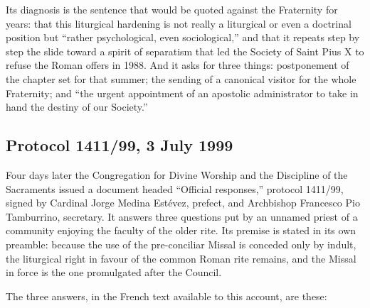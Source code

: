 Its diagnosis is the sentence that would be quoted against the Fraternity
for years: that this liturgical hardening is not really a liturgical or
even a doctrinal position but ``rather psychological, even sociological,''
and that it repeats step by step the slide toward a spirit of separatism
that led the Society of Saint Pius X to refuse the Roman offers in 1988.
And it asks for three things: postponement of the chapter set for that
summer; the sending of a canonical visitor for the whole Fraternity; and
``the urgent appointment of an apostolic administrator to take in hand the
destiny of our Society.''

\subsection{Protocol 1411/99, 3 July 1999}

Four days later the Congregation for Divine Worship and the Discipline of
the Sacraments issued a document headed ``Official responses,'' protocol
1411/99, signed by Cardinal Jorge Medina Estévez, prefect, and Archbishop
Francesco Pio Tamburrino, secretary. It answers three questions put by an
unnamed priest of a community enjoying the faculty of the older rite. Its
premise is stated in its own preamble: because the use of the
pre-conciliar Missal is conceded only by indult, the liturgical right in
favour of the common Roman rite remains, and the Missal in force is the
one promulgated after the Council.

The three answers, in the French text available to this account, are
these:

